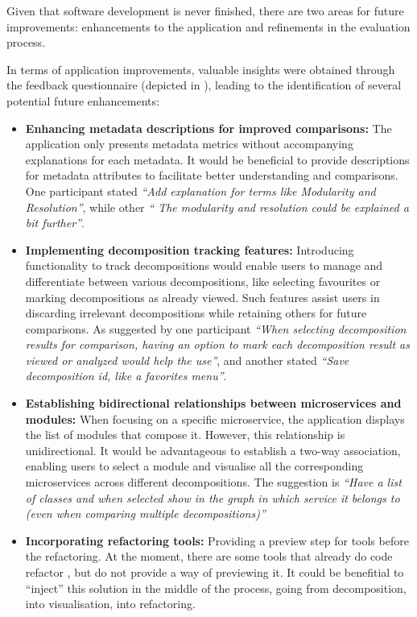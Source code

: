 Given that software development is never finished, there are two areas for
future improvements: enhancements to the application and refinements in the
evaluation process.

In terms of application improvements, valuable insights were obtained through
the feedback questionnaire (depicted in ),
leading to the identification of several potential future enhancements:

\begin{itemize}
  \item \textbf{Enhancing metadata descriptions for improved comparisons:} The
    application only presents metadata metrics without accompanying
    explanations for each metadata. It would be beneficial to provide
    descriptions for metadata attributes to facilitate better understanding and
    comparisons. One participant stated \textit{``Add explanation for terms
    like Modularity and Resolution''}, while other \textit{`` The modularity
    and resolution could be explained a bit further''}.

  \item \textbf{Implementing decomposition tracking features:} Introducing
    functionality to track decompositions would enable users to manage and
    differentiate between various decompositions, like selecting favourites or
    marking decompositions as already viewed. Such features assist users in
    discarding irrelevant decompositions while retaining others for future
    comparisons. As suggested by one participant \textit{``When selecting
      decomposition results for comparison, having an option to mark each
    decomposition result as viewed or analyzed would help the use''}, and
    another stated \textit{``Save decomposition id, like a favorites menu''}.

  \item \textbf{Establishing bidirectional relationships between microservices
    and modules:} When focusing on a specific microservice, the application
    displays the list of modules that compose it. However, this relationship is
    unidirectional. It would be advantageous to establish a two-way
    association, enabling users to select a module and visualise all the
    corresponding microservices across different decompositions. The suggestion
    is \textit{``Have a list of classes and when selected show in the graph in
      which service it belongs to (even when comparing multiple
    decompositions)''}

  \item \textbf{Incorporating refactoring tools:} Providing a preview step for
    tools before the refactoring. At the moment, there are some tools that
    already do code refactor , but do not
    provide a way of previewing it. It could be benefitial to ``inject'' this
    solution in the middle of the process, going from decomposition, into
    visualisation, into refactoring.
\end{itemize}

